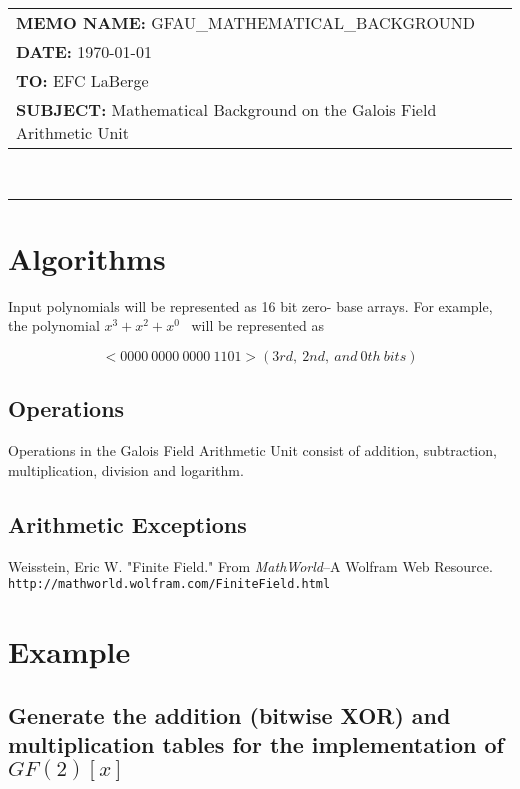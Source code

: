 \documentclass[11pt]{extarticle}
\newcommand{\examplepoly}{$x^{3}+x^{2}+x^{0}$}
\newcommand{\documentinfo}[4]{
    \begin{centering}
        \parbox{2in}{
        \begin{spacing}{1}
            \begin{flushleft}
                \begin{tabular}{l l} #1 \\ #2 \\ #3 \\ #4 \\
                \end{tabular} \\
                \rule{\textwidth}{1pt}
            \end{flushleft}
        \end{spacing} }
    \end{centering} }
\begin{document}
    \documentinfo
    {\textbf{MEMO NAME:} GFAU\_MATHEMATICAL\_BACKGROUND}
    {\textbf{DATE:} \today}
    {\textbf{TO:} EFC LaBerge}
    {\textbf{SUBJECT: } Mathematical Background on the Galois Field Arithmetic
    Unit}
    \vspace{-0.1in}

    

    \section{Algorithms} Input polynomials will be represented as 16 bit zero-
    base arrays. For example, the polynomial \examplepoly~ will be represented
    as

        \[ <0000 \ 0000 \ 0000 \ 1101> (3rd, \ 2nd, \ and \ 0th \ bits) \]

        

        
        \subsection{Operations} Operations in the Galois Field Arithmetic Unit
        consist of addition, subtraction, multiplication, division and
        logarithm.

        
        
        
        

        \subsection{Arithmetic Exceptions}

        
        

        \begin{thebibliography}{9}
            Weisstein, Eric W. "Finite Field." From \textit{MathWorld}--A
            Wolfram Web Resource.
            \texttt{http://mathworld.wolfram.com/FiniteField.html}
        \end{thebibliography}

    \iffalse
    \section{Example}

        \newpage
        \subsection{Generate the addition (bitwise XOR) and multiplication
        tables for the implementation of $GF(2)[x]$}
\end{document}
